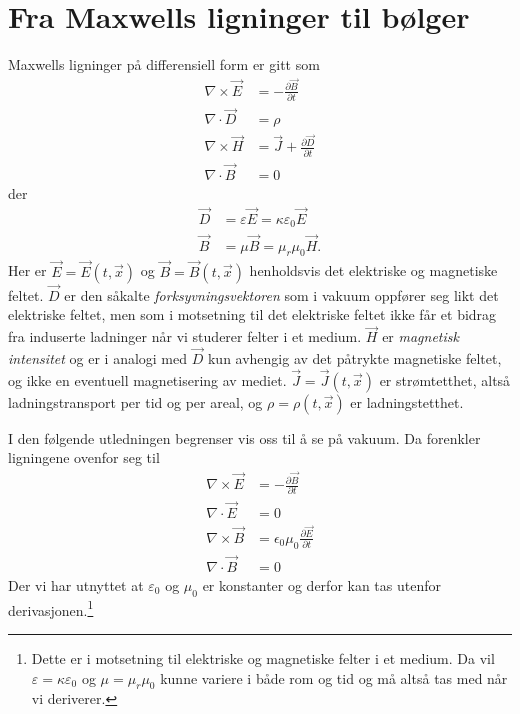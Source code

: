 \documentclass[a4paper,norsk,12pt]{article}
\begin{document}
\section*{Fra Maxwells ligninger til bølger}
Maxwells ligninger på differensiell form er gitt som
\begin{align*}
	\nabla \times \vec{E} &= -\frac{\partial\vec{B}}{\partial t}\\
	\nabla \cdot \vec{D} &= \rho \\
	\nabla \times \vec{H} &= \vec{J} + \frac{\partial\vec{D}}{\partial t} \\
	\nabla \cdot \vec{B} &= 0
\end{align*}
der
\begin{align*}
	\vec{D} &= \varepsilon\vec{E} = \kappa\varepsilon_0\vec{E} \\
	\vec{B} &= \mu\vec{B} = \mu_r\mu_0\vec{H}.
\end{align*}
Her er $\vec{E} = \vec{E}(t,\vec{x})$ og $\vec{B} = \vec{B}(t,\vec{x})$ henholdsvis det elektriske og magnetiske feltet. $\vec{D}$ er den såkalte \emph{forksyvningsvektoren} som i vakuum oppfører seg likt det elektriske feltet, men som i motsetning til det elektriske feltet ikke får et bidrag fra induserte ladninger når vi studerer felter i et medium. $\vec{H}$ er \emph{magnetisk intensitet} og er i analogi med $\vec{D}$ kun avhengig av det påtrykte magnetiske feltet, og ikke en eventuell magnetisering av mediet. $\vec{J}=\vec{J}(t,\vec{x})$ er strømtetthet, altså ladningstransport per tid og per areal, og $\rho=\rho(t,\vec{x})$ er ladningstetthet.

I den følgende  utledningen begrenser vis oss til å se på vakuum. Da forenkler ligningene ovenfor seg til 
\begin{align}
	\nabla \times \vec{E} &= -\frac{\partial\vec{B}}{\partial t} \label{eq:curlE}\\
	\nabla \cdot \vec{E} &= 0 \label{eq:divE} \\
	\nabla \times \vec{B} &= \epsilon_0\mu_0\frac{\partial\vec{E}}{\partial t} \label{eq:curlB} \\
	\nabla \cdot \vec{B} &= 0 \label{eq:divB}
\end{align}
Der vi har utnyttet at $\varepsilon_0$ og $\mu_0$ er konstanter og derfor kan tas utenfor derivasjonen.\footnote{Dette er i motsetning til elektriske og magnetiske felter i et medium. Da vil $\varepsilon = \kappa\varepsilon_0$ og $\mu = \mu_r\mu_0$ kunne variere i både rom og tid og må altså tas med når vi deriverer.}
\end{document}
